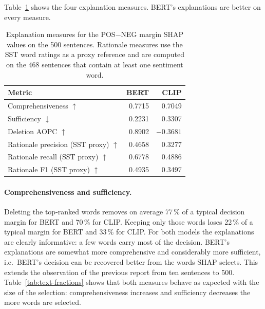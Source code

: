 \documentclass[11pt,a4paper]{article}
\newcommand{\up}{$\uparrow$}
\newcommand{\down}{$\downarrow$}
\begin{document}
Table~\ref{tab:text-metrics} shows the four explanation measures. BERT's explanations are
better on every measure.

\begin{table}[H]
  \centering
  \caption[Text explanation measures on 500 sentences]{Explanation measures for the
           POS$-$NEG margin SHAP values on the 500 sentences. Rationale measures use the SST
           word ratings as a proxy reference and are computed on the 468 sentences that
           contain at least one sentiment word.}
  \label{tab:text-metrics}
  \small
  \begin{tabular}{@{}l r r@{}}
    \toprule
    Metric & BERT & CLIP \\
    \midrule
    Comprehensiveness \up                & 0.7715 & 0.7049 \\
    Sufficiency \down                    & 0.2231 & 0.3307 \\
    Deletion AOPC \up                    & 0.8902 & $-0.3681$ \\
    Rationale precision (SST proxy) \up  & 0.4658 & 0.3277 \\
    Rationale recall (SST proxy) \up     & 0.6778 & 0.4886 \\
    Rationale F1 (SST proxy) \up         & 0.4935 & 0.3497 \\
    \bottomrule
  \end{tabular}
\end{table}

\paragraph{Comprehensiveness and sufficiency.} Deleting the top-ranked words removes on
average 77\,\% of a typical decision margin for BERT and 70\,\% for CLIP. Keeping only
those words loses 22\,\% of a typical margin for BERT and 33\,\% for CLIP. For both
models the explanations are clearly informative: a few words carry most of the decision.
BERT's explanations are somewhat more comprehensive and considerably more sufficient,
i.e.\ BERT's decision can be recovered better from the words SHAP selects. This extends the
observation of the previous report from ten sentences to 500. Table~\ref{tab:text-fractions}
shows that both measures behave as expected with the size of the selection:
comprehensiveness increases and sufficiency decreases the more words are selected.
\end{document}
